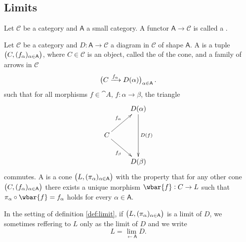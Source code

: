 \subsection*{Limits}

\begin{definition}[Diagram]
	Let $\mathcal{C}$ be a category and $\mathsf{A}$ a small category. A functor $\mathsf{A} \to \mathcal{C}$ is called a .
\end{definition}

\begin{definition}
	Let $\mathcal{C}$ be a category and $D : \mathsf{A} \to \mathcal{C}$ a diagram in $\mathcal{C}$ of shape $\mathsf{A}$. A  is a tuple $\del[1]{C,(f_\alpha)_{\alpha \in \mathsf{A}}}$, where $C \in \mathcal{C}$ is an object, called the  of the cone, and a family of arrows in $\mathcal{C}$
	\begin{equation}
		\del[1]{C \xrightarrow{f_\alpha} D(\alpha)}_{\alpha \in \mathsf{A}}.
	\end{equation}
	\noindent such that for all morphisms $f \in \cat{A}$, $f : \alpha \to \beta$, the triangle
	\begin{equation*}
		\xymatrix{
			& D(\alpha) \ar[dd]^{D(f)}\\
			C \ar[ur]^{f_\alpha}\ar[dr]_{f_\beta}\\
			& D(\beta)}
	\end{equation*}
	\noindent commutes. A  is a cone $\del[1]{L, (\pi_\alpha)_{\alpha \in \mathsf{A}}}$ with the property that for any other cone $\del[1]{C,(f_\alpha)_{\alpha \in \mathsf{A}}}$ there exists a unique morphism $\wbar{f} : C \to L$ such that $\pi_\alpha \circ \wbar{f} = f_\alpha$ holds for every $\alpha \in \mathsf{A}$.
	\label{def:limit}
\end{definition}

\begin{remark}
	In the setting of definition \ref{def:limit}, if $\del[1]{L, (\pi_\alpha)_{\alpha \in \cat{A}}}$ is a limit of $D$, we sometimes reffering to $L$ only as the limit of $D$ and we write
	\begin{equation}
		L = \lim_{\leftarrow \mathsf{A}} D.
	\end{equation}
\end{remark}

